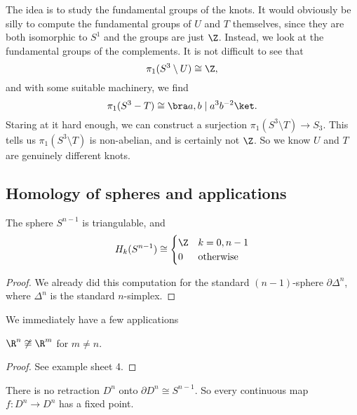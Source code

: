 \documentclass[a4paper]{article}
\begin{document}
The idea is to study the fundamental groups of the knots. It would obviously be silly to compute the fundamental groups of $U$ and $T$ themselves, since they are both isomorphic to $S^1$ and the groups are just $\Z$. Instead, we look at the fundamental groups of the complements. It is not difficult to see that
\[
  \pi_1(S^3 \setminus U) \cong \Z,
\]
and with some suitable machinery, we find
\[
  \pi_1(S^3 - T) \cong \bra a, b\mid a^3 b^{-2}\ket.
\]
Staring at it hard enough, we can construct a surjection $\pi_1(S^3 \setminus T) \to S_3$. This tells us $\pi_1(S^3 \setminus T)$ is non-abelian, and is certainly not $\Z$. So we know $U$ and $T$ are genuinely different knots.

\subsection{Homology of spheres and applications}

\begin{lemma}
  The sphere $S^{n - 1}$ is triangulable, and
  \[
    H_k(S^{n - 1}) \cong
    \begin{cases}
      \Z & k = 0, n - 1\\
      0 & \text{otherwise}
    \end{cases}
  \]
\end{lemma}
\begin{proof}
  We already did this computation for the standard $(n - 1)$-sphere $\partial \Delta^n$, where $\Delta^n$ is the standard $n$-simplex.
\end{proof}
We immediately have a few applications
\begin{prop}
  $\R^n \not\cong \R^m$ for $m \not= n$.
\end{prop}

\begin{proof}
  See example sheet 4.
\end{proof}

\begin{thm}
  There is no retraction $D^n$ onto $\partial D^n \cong S^{n - 1}$. So every continuous map $f: D^n \to D^n$ has a fixed point.
\end{thm}
\end{document}

